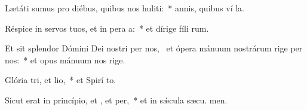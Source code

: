 \item Lætáti sumus pro diébus, quibus nos huliti:~* annis, quibus ví la.
\item Réspice in servos tuos, et in pera a:~* et dírige fíli rum.
\item Et sit splendor Dómini Dei nostri per nos,~\pscross{} et ópera mánuum nostrárum rige per nos:~* et opus mánuum nos rige.
\item Glória tri, et lio,~* et Spirí to.
\item Sicut erat in princípio, et , et per,~* et in sǽcula sæcu. men.
